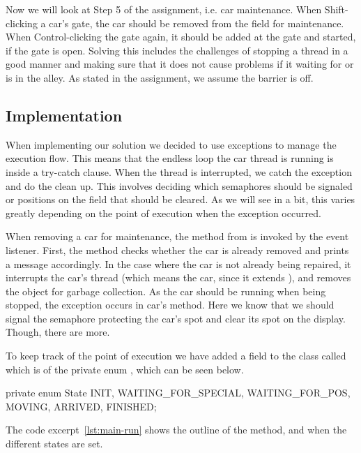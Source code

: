 
Now we will look at Step 5 of the assignment, i.e. car
maintenance. When Shift-clicking a car's gate, the car should be
removed from the field for maintenance. When Control-clicking the gate
again, it should be added at the gate and started, if the gate is
open. Solving this includes the challenges of stopping a thread in a
good manner and making sure that it does not cause problems if it
waiting for or is in the alley. As stated in the assignment, we assume
the barrier is off.


\subsection{Implementation}
\label{sub:main-moni}
When implementing our solution we decided to use exceptions to manage
the execution flow. This means that the endless loop the car thread is
running is inside a try-catch clause. When the thread is interrupted,
we catch the exception and do the clean up. This involves deciding
which semaphores should be signaled or positions on the field that
should be cleared. As we will see in a bit, this varies greatly
depending on the point of execution when the exception occurred.

When removing a car for maintenance, the  method
from  is invoked by the event listener. First, the
method checks whether the car is already removed and prints a message
accordingly. In the case where the car is not already being repaired,
it interrupts the car's thread (which means the car, since it extends
), and removes the object for garbage
collection. As the car should be running when being stopped, the
exception occurs in car's  method. Here we know that we
should signal the semaphore protecting the car's spot and clear its
spot on the display. Though, there are more.

To keep track of the point of execution we have added a field to the
 class called  which is of the private enum
, which can be seen below.

\begin{java}
private enum State {
    INIT, WAITING_FOR_SPECIAL, WAITING_FOR_POS, MOVING, ARRIVED, FINISHED;
}
\end{java}

The code excerpt~\ref{lst:main-run} shows the outline of the
 method, and when the different states are set.


